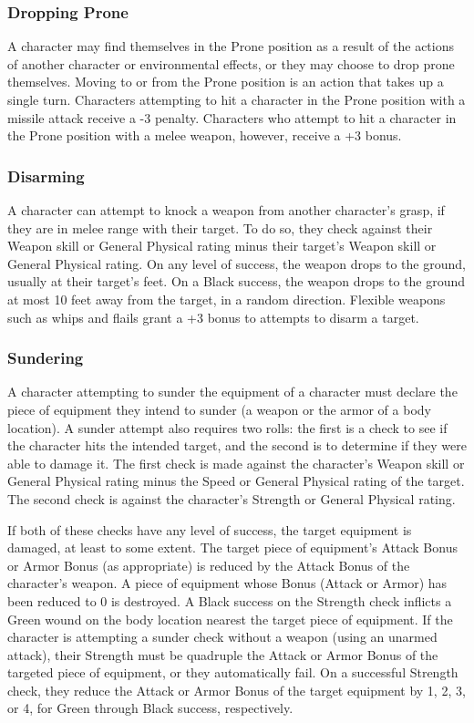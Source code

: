 \documentclass[oneside]{book}
\begin{document}
\begin{multicols}{2}
\subsubsection{Dropping Prone}
A character may find themselves in the Prone position as a result of the actions of another character or environmental effects, or they may choose to drop prone themselves. Moving to or from the Prone position is an action that takes up a single turn. Characters attempting to hit a character in the Prone position with a missile attack receive a -3 penalty. Characters who attempt to hit a character in the Prone position with a melee weapon, however, receive a +3 bonus. 

\subsubsection{Disarming}
A character can attempt to knock a weapon from another character's grasp, if they are in melee range with their target. To do so, they check against their Weapon skill or General Physical rating minus their target's Weapon skill or General Physical rating. On any level of success, the weapon drops to the ground, usually at their target's feet. On a Black success, the weapon drops to the ground at most 10 feet away from the target, in a random direction. Flexible weapons such as whips and flails grant a +3 bonus to attempts to disarm a target.

\subsubsection{Sundering}
A character attempting to sunder the equipment of a character must declare the piece of equipment they intend to sunder (a weapon or the armor of a body location). A sunder attempt also requires two rolls: the first is a check to see if the character hits the intended target, and the second is to determine if they were able to damage it. The first check is made against the character's Weapon skill or General Physical rating minus the Speed or General Physical rating of the target. The second check is against the character's Strength or General Physical rating. 

If both of these checks have any level of success, the target equipment is damaged, at least to some extent. The target piece of equipment's Attack Bonus or Armor Bonus (as appropriate) is reduced by the Attack Bonus of the character's weapon. A piece of equipment whose Bonus (Attack or Armor) has been reduced to 0 is destroyed. A Black success on the Strength check inflicts a Green wound on the body location nearest the target piece of equipment. If the character is attempting a sunder check without a weapon (using an unarmed attack), their Strength must be quadruple the Attack or Armor Bonus of the targeted piece of equipment, or they automatically fail. On a successful Strength check, they reduce the Attack or Armor Bonus of the target equipment by 1, 2, 3, or 4, for Green through Black success, respectively.


\end{multicols}
\end{document}
